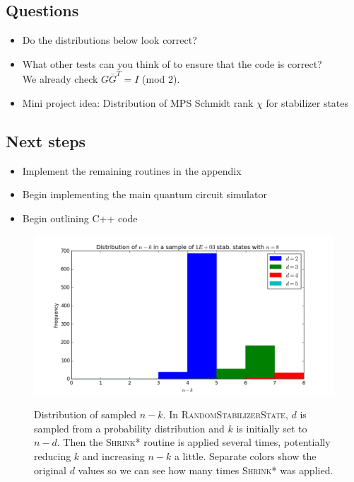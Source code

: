 \documentclass[11pt]{article}
\begin{document}
\subsection*{Questions}
\begin{itemize}
    \item Do the distributions below look correct?
    \item What other tests can you think of to ensure that the code is correct?\\ We already check $G\bar G^T = I$ (mod 2).
    \item Mini project idea: Distribution of MPS Schmidt rank $\chi$ for stabilizer states
\end{itemize}

\subsection*{Next steps}
\begin{itemize}
    \item Implement the remaining routines in the appendix
    \item Begin implementing the main quantum circuit simulator
    \item Begin outlining C++ code
\end{itemize}

\begin{figure}[h]
   \centering
    \includegraphics[width=.9\textwidth]{mar14-figs/n-k.png} \\
    \caption{Distribution of sampled $n-k$. In \textsc{RandomStabilizerState}, $d$ is sampled from a probability distribution and $k$ is initially set to $n-d$. Then the \textsc{Shrink*} routine is applied several times, potentially reducing $k$ and increasing $n-k$ a little. Separate colors show the original $d$ values so we can see how many times \textsc{Shrink*} was applied. }
\end{figure}
\end{document}
